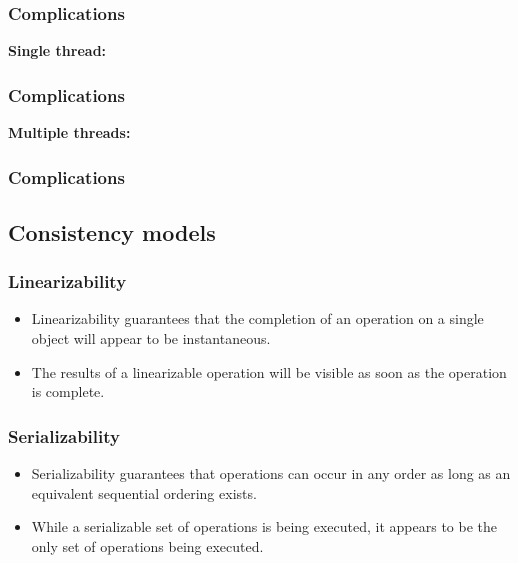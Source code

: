 \documentclass{beamer}
\begin{document}
  \begin{frame}
    \frametitle{Complications}
    \centering

    \textbf{Single thread:}
    \vfill
    \resizebox{0.9\linewidth}{!}{}
  \end{frame}

  \begin{frame}
    \frametitle{Complications}
    \centering

    \textbf{Multiple threads:}
    \vfill
    \resizebox{0.9\linewidth}{!}{}
  \end{frame}

  \begin{frame}
    \frametitle{Complications}

    \centering
    
  \end{frame}

  \subsection{Consistency models}

  \begin{frame}
    \frametitle{Linearizability}

    \begin{figure}
      \centering
      
    \end{figure}

    \vfill

    \begin{itemize}
      \item Linearizability guarantees that the completion of an operation on a single object will appear to be instantaneous.
      \item The results of a linearizable operation will be visible as soon as the operation is complete.
    \end{itemize}
  \end{frame}

  \begin{frame}
    \frametitle{Serializability}

    \begin{figure}
      \centering
      
    \end{figure}

    \vfill

    \begin{itemize}
      \item Serializability guarantees that operations can occur in any order as long as an equivalent sequential ordering exists.
      \item While a serializable set of operations is being executed, it appears to be the only set of operations being executed.
    \end{itemize}
  \end{frame}
\end{document}
